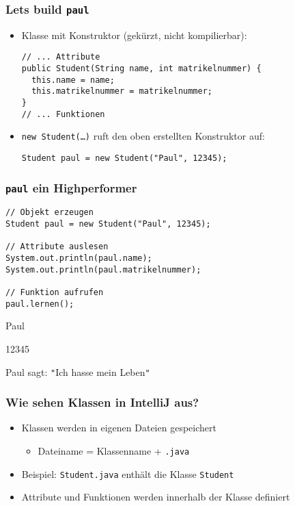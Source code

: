 \documentclass{../../presentation}
\begin{document}
\begin{frame}[fragile]
	\frametitle{Let\textquotesingle s build \texttt{paul}}
	\begin{itemize}
		\item Klasse mit Konstruktor (gekürzt, nicht kompilierbar):
		      \begin{verbatim}
// ... Attribute 
public Student(String name, int matrikelnummer) {
  this.name = name;
  this.matrikelnummer = matrikelnummer;
}
// ... Funktionen
			  \end{verbatim}
		\item<2->\texttt{new Student(\dots)} ruft den oben erstellten Konstruktor auf:
		      \begin{verbatim}
Student paul = new Student("Paul", 12345);
			  \end{verbatim}
	\end{itemize}
\end{frame}


\begin{frame}[fragile]
	\frametitle{\texttt{paul} ein Highperformer}
	\begin{verbatim}
// Objekt erzeugen
Student paul = new Student("Paul", 12345);

// Attribute auslesen
System.out.println(paul.name);
System.out.println(paul.matrikelnummer);

// Funktion aufrufen
paul.lernen();
\end{verbatim}

	\begin{ausgabe}
		Paul

		12345

		Paul sagt: \texttt{"}Ich hasse mein Leben\texttt{"}
	\end{ausgabe}
\end{frame}

\begin{frame}[fragile]
	\frametitle{Wie sehen Klassen in IntelliJ aus?}
	\pause
	\begin{itemize}
		\item Klassen werden in eigenen Dateien gespeichert
		      \pause
		      \begin{itemize}
			      \item[\textbullet] Dateiname = Klassenname + \texttt{.java}
		      \end{itemize}
		      \pause
		\item Beispiel: \texttt{Student.java} enthält die Klasse \texttt{Student}
		      \pause
		\item Attribute und Funktionen werden innerhalb der Klasse definiert
	\end{itemize}
\end{frame}
\end{document}
